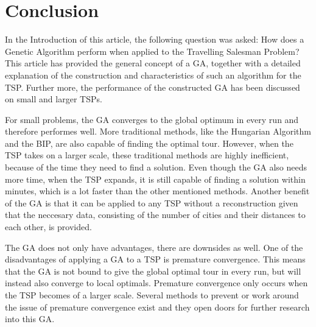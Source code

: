 \section{Conclusion}
\par
In the Introduction of this article, the following question was asked: How does a Genetic Algorithm perform when applied to the Travelling Salesman Problem?
This article has provided the general concept of a GA, together with a detailed explanation of the construction and characteristics of such an algorithm for the TSP. Further more, the performance of the constructed GA has been discussed on small and larger TSPs. 

\par
For small problems, the GA converges to the global optimum in every run and therefore performes well. More traditional methods, like the Hungarian Algorithm and the BIP, are also capable of finding the optimal tour. However, when the TSP takes on a larger scale, these traditional methods are highly inefficient, because of the time they need to find a solution. Even though the GA also needs more time, when the TSP expands, it is still capable of finding a solution within minutes, which is a lot faster than the other mentioned methods. Another benefit of the GA is that it can be applied to any TSP without a reconstruction given that the neccesary data, consisting of the number of cities and their distances to each other, is provided. 

\par
The GA does not only have advantages, there are downsides as well. One of the disadvantages of applying a GA to a TSP is premature convergence. This means that the GA is not bound to give the global optimal tour in every run, but will instead also converge to local optimals. Premature convergence only occurs when the TSP becomes of a larger scale. Several methods to prevent or work around the issue of premature convergence exist \cite{Premconvergence} and they open doors for further research into this GA. 
